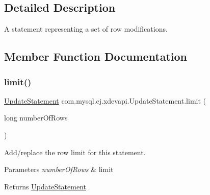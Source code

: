 \subsection{Detailed Description}
A statement representing a set of row modifications. 

\subsection{Member Function Documentation}
\mbox{\label{interfacecom_1_1mysql_1_1cj_1_1xdevapi_1_1_update_statement_aa0c63fa683850b7140811b5d52de3fe9}} 
\subsubsection{\texorpdfstring{limit()}{limit()}}
{\footnotesize\ttfamily \mbox{\hyperlink{interfacecom_1_1mysql_1_1cj_1_1xdevapi_1_1_update_statement}{Update\+Statement}} com.\+mysql.\+cj.\+xdevapi.\+Update\+Statement.\+limit (\begin{DoxyParamCaption}\item[{long}]{number\+Of\+Rows }\end{DoxyParamCaption})}

Add/replace the row limit for this statement.


\begin{DoxyParams}{Parameters}
{\em number\+Of\+Rows} & limit \\
\hline
\end{DoxyParams}
\begin{DoxyReturn}{Returns}
\mbox{\hyperlink{interfacecom_1_1mysql_1_1cj_1_1xdevapi_1_1_update_statement}{Update\+Statement}} 
\end{DoxyReturn}
\mbox{\label{interfacecom_1_1mysql_1_1cj_1_1xdevapi_1_1_update_statement_abc8c16c23cdf1c91f25150510daa50fd}} 
